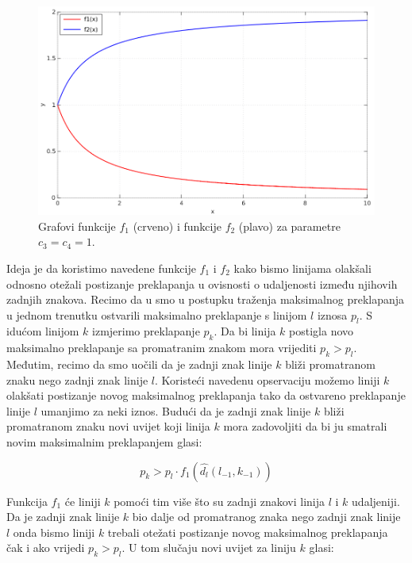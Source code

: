 \documentclass[times, utf8, zavrsni]{fer}
\begin{document}
\begin{figure}[htb]
    \centering
    \captionsetup{justification=centering,margin=2cm}
    \includegraphics[width=\textwidth]{images/function-01.png}
    \caption{
        Grafovi funkcije $f_1$ (crveno) i funkcije $f_2$ (plavo) za parametre
        $c_3 = c_4 = 1$.
    }
    \label{fig:function-01}
\end{figure}

Ideja je da koristimo navedene funkcije $f_1$ i $f_2$ kako bismo linijama
olakšali odnosno otežali postizanje preklapanja u ovisnosti o udaljenosti između
njihovih zadnjih znakova. Recimo da u smo u postupku traženja maksimalnog
preklapanja u jednom trenutku ostvarili maksimalno preklapanje s linijom $l$
iznosa $p_l$. S idućom linijom $k$ izmjerimo preklapanje $p_k$. Da bi linija
$k$ postigla novo maksimalno preklapanje sa promatranim znakom mora vrijediti
$p_k > p_l$. Međutim, recimo da smo uočili da je zadnji znak linije $k$
bliži promatranom znaku nego zadnji znak linije $l$. Koristeći navedenu
opservaciju možemo liniji $k$ olakšati postizanje novog maksimalnog
preklapanja tako da ostvareno preklapanje linije $l$ umanjimo za neki iznos.
Budući da je zadnji znak linije $k$ bliži promatranom znaku novi uvijet koji
linija $k$ mora zadovoljiti da bi ju smatrali novim maksimalnim preklapanjem
glasi:

\begin{equation}
p_k > p_l \cdot f_1(\hat{d_l}(l_{-1},k_{-1}))
\end{equation}

Funkcija $f_1$ će liniji $k$ pomoći tim više što su zadnji znakovi linija
$l$ i $k$ udaljeniji. Da je zadnji znak linije $k$ bio dalje od
promatranog znaka nego zadnji znak linije $l$ onda bismo liniji $k$ trebali
otežati postizanje novog maksimalnog preklapanja čak i ako vrijedi $p_k > p_l$. U tom slučaju novi uvijet za liniju $k$ glasi:
\end{document}

